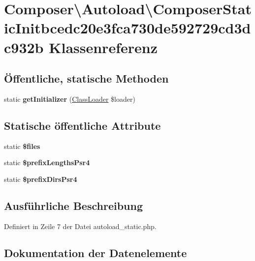 \hypertarget{class_composer_1_1_autoload_1_1_composer_static_initbcedc20e3fca730de592729cd3dc932b}{}\section{Composer\textbackslash{}Autoload\textbackslash{}Composer\+Static\+Initbcedc20e3fca730de592729cd3dc932b Klassenreferenz}
\label{class_composer_1_1_autoload_1_1_composer_static_initbcedc20e3fca730de592729cd3dc932b}
\subsection*{Öffentliche, statische Methoden}
\begin{DoxyCompactItemize}
\item 
\mbox{\label{class_composer_1_1_autoload_1_1_composer_static_initbcedc20e3fca730de592729cd3dc932b_a27fc355d29d07dc6829b65208ef0c343}} 
static {\bfseries get\+Initializer} (\mbox{\hyperlink{class_composer_1_1_autoload_1_1_class_loader}{Class\+Loader}} \$loader)
\end{DoxyCompactItemize}
\subsection*{Statische öffentliche Attribute}
\begin{DoxyCompactItemize}
\item 
static {\bfseries \$files}
\item 
static {\bfseries \$prefix\+Lengths\+Psr4}
\item 
static {\bfseries \$prefix\+Dirs\+Psr4}
\end{DoxyCompactItemize}


\subsection{Ausführliche Beschreibung}


Definiert in Zeile 7 der Datei autoload\+\_\+static.\+php.



\subsection{Dokumentation der Datenelemente}
\mbox{\label{class_composer_1_1_autoload_1_1_composer_static_initbcedc20e3fca730de592729cd3dc932b_a09241b8841e8798616c1e9f38165a2bf}} 

